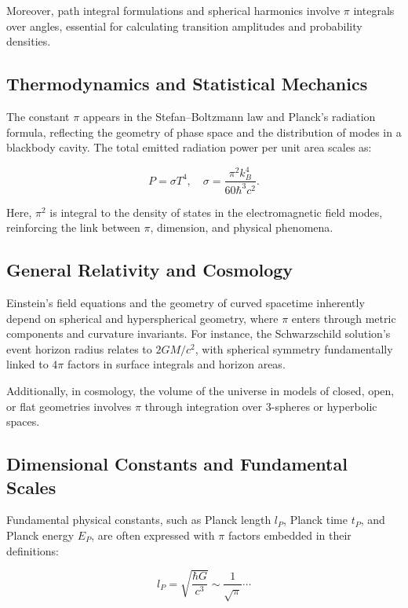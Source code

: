 \documentclass[12pt,a4paper]{article}
\begin{document}
Moreover, path integral formulations and spherical harmonics involve \(\pi\) integrals over angles, essential for calculating transition amplitudes and probability densities.

\subsection{Thermodynamics and Statistical Mechanics}

The constant \(\pi\) appears in the Stefan–Boltzmann law and Planck’s radiation formula, reflecting the geometry of phase space and the distribution of modes in a blackbody cavity. The total emitted radiation power per unit area scales as:

\begin{equation}
P = \sigma T^4, \quad \sigma = \frac{\pi^2 k_B^4}{60 \hbar^3 c^2}.
\end{equation}

Here, \(\pi^2\) is integral to the density of states in the electromagnetic field modes, reinforcing the link between \(\pi\), dimension, and physical phenomena.

\subsection{General Relativity and Cosmology}

Einstein’s field equations and the geometry of curved spacetime inherently depend on spherical and hyperspherical geometry, where \(\pi\) enters through metric components and curvature invariants. For instance, the Schwarzschild solution’s event horizon radius relates to \(2GM/c^2\), with spherical symmetry fundamentally linked to \(4\pi\) factors in surface integrals and horizon areas.

Additionally, in cosmology, the volume of the universe in models of closed, open, or flat geometries involves \(\pi\) through integration over 3-spheres or hyperbolic spaces.

\subsection{Dimensional Constants and Fundamental Scales}

Fundamental physical constants, such as Planck length \(l_P\), Planck time \(t_P\), and Planck energy \(E_P\), are often expressed with \(\pi\) factors embedded in their definitions:

\begin{equation}
l_P = \sqrt{\frac{\hbar G}{c^3}} \sim \frac{1}{\sqrt{\pi}} \cdots
\end{equation}
\end{document}
